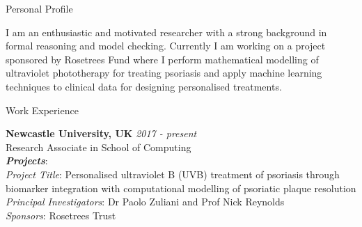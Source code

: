 \documentclass{resume} %
\begin{document}

\begin{rSection}{Personal Profile}

I am an enthusiastic and motivated researcher with a strong background in formal reasoning
and model checking. Currently I am working on a project sponsored by Rosetrees Fund 
where I perform mathematical modelling of ultraviolet phototherapy for treating psoriasis and 
apply machine learning techniques to clinical data for designing personalised treatments.


\end{rSection}


\begin{rSection}{Work Experience}


{\bf Newcastle University, UK} \hfill {\em 2017 - present} \\
Research Associate in School of Computing \\

{\bf \em Projects}: \\
{\em Project Title}: Personalised ultraviolet B (UVB) treatment of psoriasis through biomarker 
integration with computational modelling of psoriatic plaque resolution \\
{\em Principal Investigators}: Dr Paolo Zuliani and Prof Nick Reynolds \\
{\em Sponsors}: Rosetrees Trust %
\end{rSection}
\end{document}
